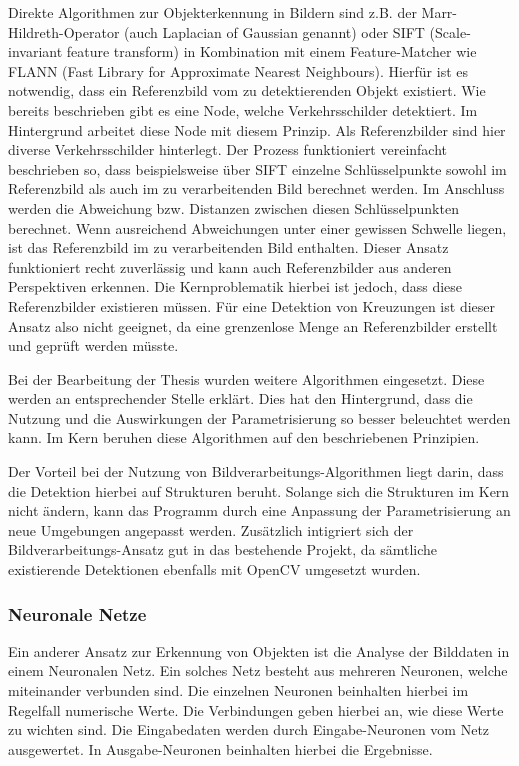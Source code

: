 Direkte Algorithmen zur Objekterkennung in Bildern sind z.B. der Marr-Hildreth-Operator (auch Laplacian of Gaussian genannt) oder SIFT (Scale-invariant feature transform) in Kombination
mit einem Feature-Matcher wie FLANN (Fast Library for Approximate Nearest Neighbours). Hierfür ist es notwendig, dass ein Referenzbild vom zu detektierenden Objekt existiert.
Wie bereits beschrieben gibt es eine Node, welche Verkehrsschilder detektiert. Im Hintergrund arbeitet diese Node mit diesem Prinzip. Als Referenzbilder sind hier diverse Verkehrsschilder
hinterlegt. Der Prozess funktioniert vereinfacht beschrieben so, dass beispielsweise über SIFT einzelne Schlüsselpunkte sowohl im Referenzbild als auch im zu verarbeitenden Bild berechnet werden. Im Anschluss
werden die Abweichung bzw. Distanzen zwischen diesen Schlüsselpunkten berechnet. Wenn ausreichend Abweichungen unter einer gewissen Schwelle liegen, ist das Referenzbild im zu verarbeitenden Bild enthalten.
Dieser Ansatz funktioniert recht zuverlässig und kann auch Referenzbilder aus anderen Perspektiven erkennen. Die Kernproblematik hierbei ist jedoch, dass diese Referenzbilder existieren müssen. Für eine
Detektion von Kreuzungen ist dieser Ansatz also nicht geeignet, da eine grenzenlose Menge an Referenzbilder erstellt und geprüft werden müsste.

Bei der Bearbeitung der Thesis wurden weitere Algorithmen eingesetzt. Diese werden an entsprechender Stelle erklärt. Dies hat den Hintergrund, dass die Nutzung und die Auswirkungen der 
Parametrisierung so besser beleuchtet werden kann. Im Kern beruhen diese Algorithmen auf den beschriebenen Prinzipien.

Der Vorteil bei der Nutzung von Bildverarbeitungs-Algorithmen liegt darin, dass die Detektion hierbei auf Strukturen beruht. Solange sich die Strukturen im Kern nicht ändern, kann
das Programm durch eine Anpassung der Parametrisierung an neue Umgebungen angepasst werden. Zusätzlich intigriert sich der Bildverarbeitungs-Ansatz gut in das bestehende Projekt,
da sämtliche existierende Detektionen ebenfalls mit OpenCV umgesetzt wurden.


\subsubsection{Neuronale Netze}
Ein anderer Ansatz zur Erkennung von Objekten ist die Analyse der Bilddaten in einem Neuronalen Netz. Ein solches Netz besteht aus mehreren Neuronen, welche miteinander verbunden sind.
Die einzelnen Neuronen beinhalten hierbei im Regelfall numerische Werte. Die Verbindungen geben hierbei an, wie diese Werte zu wichten sind. Die Eingabedaten werden durch Eingabe-Neuronen
vom Netz ausgewertet. In Ausgabe-Neuronen beinhalten hierbei die Ergebnisse.

